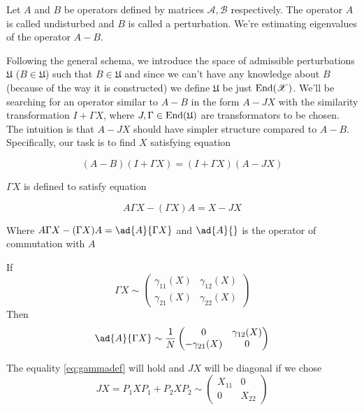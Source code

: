 \documentclass{article}
\begin{document}
Let \( A \) and \( B \) be operators defined by matrices \( \mathcal A, \mathcal B \) respectively.
The operator \( A \) is called undisturbed and \( B \) is called a perturbation.
We're estimating eigenvalues of the operator \( A - B \).

Following the general schema, we introduce
the space of admissible perturbations \( \mathfrak U \) (\( B\in\mathfrak U \))
such that \( B \in \mathfrak U \)
and since we can't have any knowledge about \( B \) (because of the way it is constructed)
we define \( \mathfrak U \) be just \( \mathrm{End}({\mathscr X}) \).
We'll be searching for an operator similar to \( A - B \)
in the form \( A - JX \) with the similarity transformation \( I + \Gamma X \),
where \( J, \Gamma \in \mathrm{End}({\mathfrak U}) \) are transformators to be chosen.
The intuition is that \( A - JX \) should have simpler structure compared to \( A-B \).
Specifically, our task is to find \( X \) satisfying equation

\begin{equation}\label{eq:simopmain}
    (A - B)(I + \Gamma X) = (I + \Gamma X)(A - JX)
\end{equation}

\( \Gamma X \) is defined to satisfy equation

\begin{equation}
\label{eq:gammadef}
    A\Gamma X - (\Gamma X) A = X - JX
\end{equation}

Where \( A\Gamma X - (\Gamma X) A = \ad{A}{\Gamma X} \) and \( \ad{A}{} \) is the operator of commutation with \( A \)

If
\[
    \Gamma X \sim
    \begin{pmatrix}
        \gamma_{11}(X) & \gamma_{12}(X) \\
        \gamma_{21}(X) & \gamma_{22}(X)
    \end{pmatrix}
    \]
Then
\[
    \ad{A}{\Gamma X} \sim
    \frac1N
    \begin{pmatrix}
        0 & \gamma_{12}(X) \\
        - \gamma_{21}(X) & 0
    \end{pmatrix}
    \]

The equality \eqref{eq:gammadef} will hold and \( JX \) will be diagonal if we chose
\[
    JX = P_1 X P_1 + P_2 X P_2 \sim
    \begin{pmatrix}
        X_{11} & 0 \\
        0      & X_{22}
    \end{pmatrix}
    \]
\end{document}
